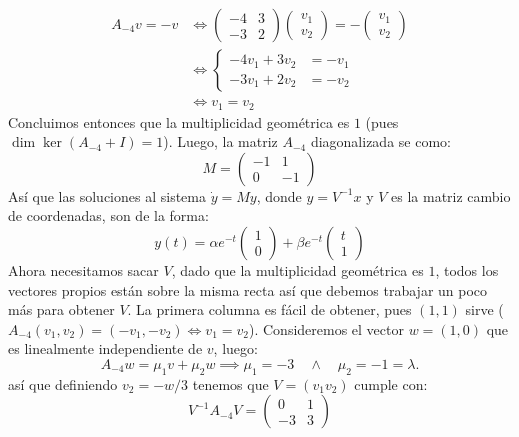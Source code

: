 \documentclass[10pt]{article}
\begin{document}
\begin{plist}
\begin{align*}
    A_{-4} v = -v
    &\iff
    \begin{pmatrix}
    -4 & 3\\
    -3 & 2
    \end{pmatrix}
    \begin{pmatrix} v_1 \\ v_2 \end{pmatrix}
    =
    -\begin{pmatrix} v_1 \\ v_2 \end{pmatrix}
    \\&\iff
    \begin{cases}
        -4 v_1 + 3 v_2 &= -v_1\\
        -3 v_1 + 2 v_2 &= -v_2
    \end{cases}
    \\&\iff
    v_1 = v_2
\end{align*}
Concluimos entonces que la multiplicidad geométrica es \(1\) (pues \(\dim \ker
(A_{-4} + I) = 1\)). Luego, la matriz \(A_{-4}\) diagonalizada se como:
\[
    M =
    \begin{pmatrix}
    -1 & 1\\
    0 & -1
    \end{pmatrix}
\]
Así que las soluciones al sistema \(\dot{y} = M y\), donde \(y = V^{-1} x\) y
\(V\) es la matriz cambio de coordenadas, son de la forma:
\[
    y(t)
    =
    \alpha e^{-t} \begin{pmatrix} 1 \\ 0 \end{pmatrix}
    +
    \beta e^{-t} \begin{pmatrix} t \\ 1 \end{pmatrix}
\]
Ahora necesitamos sacar \(V\), dado que la multiplicidad geométrica es \(1\),
todos los vectores propios están sobre la misma recta así que debemos trabajar
un poco más para obtener \(V\). La primera columna es fácil de obtener, pues
\((1,1)\) sirve (\(A_{-4}(v_1, v_2) = (-v_1, -v_2) \iff v_1 = v_2\)).
Consideremos el vector \(w = (1, 0)\) que es linealmente independiente de \(v\),
luego:
\[
    A_{-4} w = \mu_1 v + \mu_2 w
    \implies
    \mu_1 = -3
    \quad\land\quad
    \mu_2 = -1 = \lambda
.\]
así que definiendo \(v_2 = -w/3\) tenemos que \(V = (v_1 v_2)\) cumple con:
\[
    V^{-1} A_{-4} V
    =
    \begin{pmatrix}
    0 & 1\\
    -3 & 3
    \end{pmatrix}
\]
\end{plist}
\end{document}
